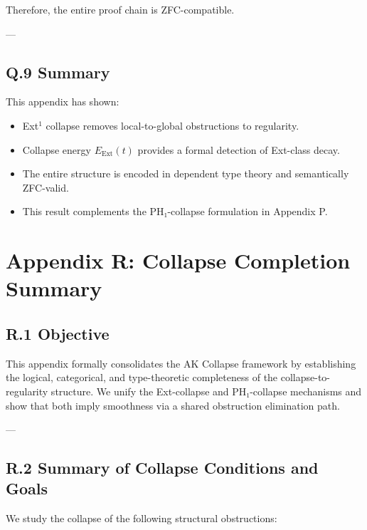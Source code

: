 \documentclass[11pt]{article}
\begin{document}
{Therefore, the entire proof chain is ZFC-compatible.

---

\subsection*{Q.9 Summary}

This appendix has shown:
\begin{itemize}
  \item Ext$^1$ collapse removes local-to-global obstructions to regularity.
  \item Collapse energy $E_{\mathrm{Ext}}(t)$ provides a formal detection of Ext-class decay.
  \item The entire structure is encoded in dependent type theory and semantically ZFC-valid.
  \item This result complements the PH₁-collapse formulation in Appendix P.
\end{itemize}




\section*{Appendix R: Collapse Completion Summary}

\subsection*{R.1 Objective}

This appendix formally consolidates the AK Collapse framework by establishing the logical, categorical, and type-theoretic completeness of the collapse-to-regularity structure.  
We unify the Ext-collapse and PH₁-collapse mechanisms and show that both imply smoothness via a shared obstruction elimination path.

---

\subsection*{R.2 Summary of Collapse Conditions and Goals}

We study the collapse of the following structural obstructions:

}
\end{document}

